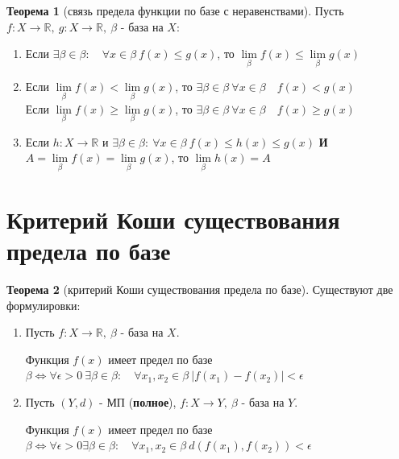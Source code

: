 \documentclass{report}
\theoremstyle{definition}
\newtheorem*{theorem}{Теорема}
\begin{document}
\begin{theorem}[связь предела функции по базе с неравенствами]
    Пусть $f:X\rightarrow\mathbb{R}, \ g:X\rightarrow\mathbb{R}, \ \beta$ - база на $X$:
    \begin{enumerate}
        \item Если $\exists\beta\in\beta: \quad \forall x \in \beta \ f(x) \leqslant g(x)$, то $\underset{\beta}
                  {\lim}f(x) \leqslant \underset{\beta}{\lim}g(x)$
        \item Если $\underset{\beta}{\lim}f(x) < \underset{\beta}{\lim}g(x)$, то $\exists\beta\in\beta \ \forall
                  x \in \beta \quad f(x) < g(x)$\\

              Если $\underset{\beta}{\lim}f(x) \geqslant \underset{\beta}{\lim}g(x)$, то $\exists\beta\in\beta \ \forall
                  x \in \beta \quad f(x) \geqslant g(x)$
        \item Если $h:X\rightarrow \mathbb{R}$ и $\exists\beta\in\beta: \ \forall x \in \beta \ f(x) \leqslant h(x)
                  \leqslant g(x)$ \textbf{И} $A = \underset{\beta}{\lim}f(x) = \underset{\beta}{\lim}g(x)$, то $\underset{\beta}
                  {\lim}h(x) = A$
    \end{enumerate}
\end{theorem}

\section{Критерий Коши существования предела по базе}

\begin{theorem}[критерий Коши существования предела по базе]
    Существуют две формулировки:
    \begin{enumerate}
        \item Пусть $f:X\rightarrow\mathbb{R}, \ \beta$ - база на $X$.

              Функция $f(x)$ имеет предел по базе $\beta \iff \forall \epsilon > 0 \ \exists\beta\in\beta: \quad \forall
                  x_{1},x_{2} \in \beta \ |f(x_{1}) - f(x_{2})| < \epsilon$

        \item Пусть $(Y,d)$ - МП (\textbf{полное}), $f:X\rightarrow Y, \ \beta$ - база на $Y$.

              Функция $f(x)$ имеет предел по базе $\beta \iff \forall \epsilon>0\exists\beta\in\beta: \quad \forall
                  x_{1},x_{2} \in \beta \ d(f(x_{1}), f(x_{2})) < \epsilon$
    \end{enumerate}
\end{theorem}
\end{document}
